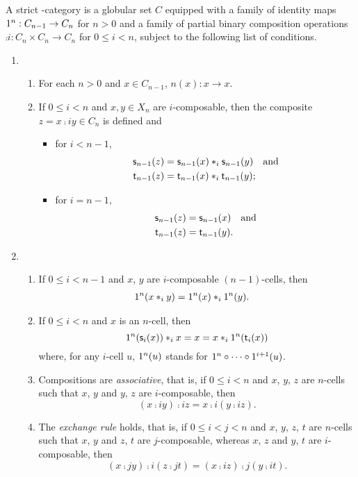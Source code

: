 A strict \oo-category  is a globular set $C$ equipped with a family of identity maps
$1^{n}:C_{n-1}\to C_n$ for $n>0$ and a family of partial binary composition operations  $\comp i:C_n\times C_n\to C_n$ for $0\leq i< n$, subject to the following list of conditions. 
\begin{enumerate}
\item
  \begin{enumerate}
  \item For each $n>0$ and $x\in C_{n-1}$, $\unit{n}(x): x\to x$.
  \item If $0\leq i<n$ and $x,y\in X_n$ are $i$-composable, then the composite $z=x\comp i y\in C_n$ is defined and
    \begin{itemize}
    \item for $i<n-1$,
      \begin{align*}
        \mathsf{s}_{n-1}(z) & =\mathsf{s}_{n-1}(x)\ast_{i}\mathsf{s}_{n-1}(y)\quad \hbox{and}\\
        \mathsf{t}_{n-1}(z) & =\mathsf{t}_{n-1}(x)\ast_{i}\mathsf{t}_{n-1}(y) ;
      \end{align*}
    \item  for $i=n-1$,
      \begin{align*}
        \mathsf{s}_{n-1}(z) & =\mathsf{s}_{n-1}(x) \quad \hbox{and}\\
         \mathsf{t}_{n-1}(z) & =\mathsf{t}_{n-1}(y).
      \end{align*}
    \end{itemize}
    \end{enumerate}
\item
  \begin{enumerate}
  \item If $0\leq i <n-1$ and $x$, $y$ are $i$-composable $(n{-}1)$-cells, then
    \begin{align*}
      1^{n}(x\ast_{i} y) & =1^{n}(x)\ast_{i} 1^{n}(y).
    \end{align*}
  \item If $0\leq i<n$ and $x$ is an $n$-cell, then
    \[1^{n}(\mathsf{s}_{i}(x))\ast_{i} x=x=x\ast_{i}1^{n}(\mathsf{t}_{i}(x))\]
    where, for any $i$-cell $u$, $1^{n}(u)$ stands for $1^{n}\circ\cdots\circ1^{i+1}(u)$.
  \item Compositions are {\em associative}, that is, if $0\leq i<n$ and $x$, $y$, $z$ are $n$-cells such that $x$, $y$ and $y$, $z$ are $i$-composable, then
    \[(x\comp i y)\comp i z=x\comp i (y\comp i z).\]
  \item The {\em exchange rule} holds, that is, if $0\leq i<j<n$ and $x$, $y$, $z$, $t$ are $n$-cells such that $x$, $y$ and $z$, $t$ are $j$-composable, whereas $x$, $z$ and $y$, $t$ are $i$-composable, then
    \[(x\comp j y)\comp i (z\comp j t)= (x\comp i z)\comp j (y\comp i t).\]
  \end{enumerate}
\end{enumerate}
